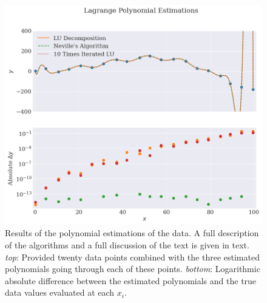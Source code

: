 \begin{figure}
    \centering
    \includegraphics[width=\textwidth]{results/vandermonde_fitresults.png}
    \caption{Results of the polynomial estimations of the data. A full description of the algorithms and a full discussion of the text is given in text. \textit{top}: Provided twenty data points combined with the three estimated polynomials going through each of these points. \textit{bottom}: Logarithmic absolute difference between the estimated polynomials and the true data values evaluated at each $x_i$.}
    \label{fig:vandermonde_fitresults}
\end{figure}


